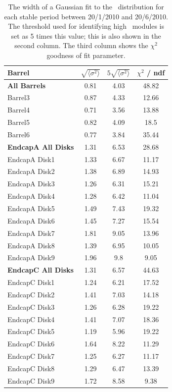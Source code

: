 \begin{table}[h]
 \centering
\begin{tabular}{ l  c  c  c }
\hline\hline
Barrel & $\sqrt{\langle \sigma ^ 2 \rangle }$ & $5\sqrt{\langle \sigma ^ 2 \rangle }$ & $\chi ^2$  / ndf\\
\hline
\textbf{All Barrels} & 0.81 & 4.03 & 48.82 \\
Barrel3 & 0.87 & 4.33 & 12.66 \\
Barrel4 & 0.71 & 3.56 & 13.88 \\
Barrel5 & 0.82 & 4.09 & 18.5 \\
Barrel6 & 0.77 & 3.84 & 35.44 \\
\hline
\textbf{EndcapA All Disks} & 1.31 & 6.53 & 28.68 \\
EndcapA Disk1 & 1.33 & 6.67 & 11.17 \\
EndcapA Disk2 & 1.38 & 6.89 & 14.93 \\
EndcapA Disk3 & 1.26 & 6.31 & 15.21 \\
EndcapA Disk4 & 1.28 & 6.42 & 11.04 \\
EndcapA Disk5 & 1.49 & 7.43 & 19.32 \\
EndcapA Disk6 & 1.45 & 7.27 & 15.54 \\
EndcapA Disk7 & 1.81 & 9.05 & 13.96 \\
EndcapA Disk8 & 1.39 & 6.95 & 10.05 \\
EndcapA Disk9 & 1.96 & 9.8 & 9.05 \\
\hline
\textbf{EndcapC All Disks} & 1.31 & 6.57 & 44.63 \\
EndcapC Disk1 & 1.24 & 6.21 & 17.52 \\
EndcapC Disk2 & 1.41 & 7.03 & 14.18 \\
EndcapC Disk3 & 1.26 & 6.28 & 19.22 \\
EndcapC Disk4 & 1.41 & 7.07 & 18.36 \\
EndcapC Disk5 & 1.19 & 5.96 & 19.22 \\
EndcapC Disk6 & 1.64 & 8.22 & 11.29 \\
EndcapC Disk7 & 1.25 & 6.27 & 11.17 \\
EndcapC Disk8 & 1.29 & 6.47 & 13.39 \\
EndcapC Disk9 & 1.72 & 8.58 & 9.38 \\
\hline\hline
\end{tabular}
\caption{The width of a Gaussian fit to the \tdiff\ distribution for each
stable period between 20/1/2010 and 20/6/2010. The threshold used for
identifying high \tdiff\ modules is set as 5 times this value; this is also shown
in the second column. The third column shows the $\chi^2$ goodness of fit
parameter.}
\label{table:tdiff_thresh}
\end{table}

